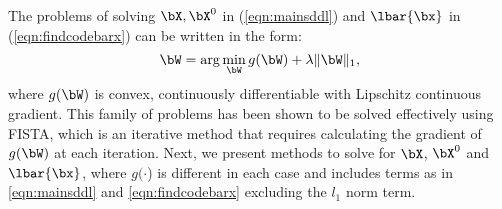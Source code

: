 \documentclass[letterpaper]{article}
\begin{document}
\par The problems of solving $\bX, \bX^0$ in (\ref{eqn:mainsddl}) and $\lbar{\bx}$ in (\ref{eqn:findcodebarx}) can be written in the form:
\begin{equation}
\label{eqn:fista}
    \bW = \arg\min_{\bW} g(\bW) + \lambda\|\bW\|_1,
\end{equation}
where $g(\bW)$ is convex, continuously differentiable with Lipschitz continuous gradient. This family of problems has been shown to be solved effectively using FISTA\cite{beck2009fast}, which is an iterative method that requires calculating the gradient of $g(\bW)$ at each iteration. Next, we present methods to solve for $\bX$, $\bX^{0}$ and $\lbar{\bx}$, where $g(\cdot$) is different in each case and includes terms as in \eqref{eqn:mainsddl} and \eqref{eqn:findcodebarx} excluding the $l_1$ norm term.
\end{document}

